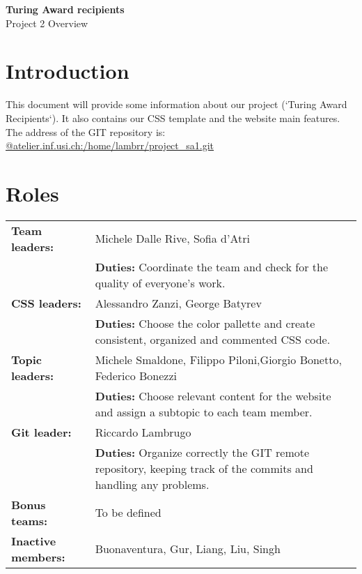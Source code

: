 \documentclass[a4paper,12pt]{article}
\begin{document}
\newcommand{\ttilde}[0]{\raisebox{0.5ex}{\texttildelow}}

\begin{center}
 \huge{\textbf{Turing Award recipients}}\\[.5em]
 \Large{Project 2 Overview}
\end{center}
\vspace{3em}
\tableofcontents

\newpage
\section{Introduction}
This document will provide some information about our project (`Turing Award Recipients`). It also contains our CSS template and the website main features.
The address of the GIT repository is: \url{@atelier.inf.usi.ch:/home/lambrr/project_sa1.git}

\vspace{2em}

\section{Roles}
\begin{tabular}{p{.275\linewidth} p{.65\linewidth}}
\textbf{Team leaders:} & Michele Dalle Rive, Sofia d'Atri\\[.3em]
                        &\textbf{Duties:} Coordinate the team and check for the quality of everyone's work.\\[.5em]
\textbf{CSS leaders:} & Alessandro Zanzi, George Batyrev\\[.3em]
                        &\textbf{Duties:} Choose the color pallette and create consistent, organized and commented CSS code.\\[.5em]
\textbf{Topic leaders:} & Michele Smaldone, Filippo Piloni,\newline Giorgio Bonetto, Federico Bonezzi\\[.3em]
                        &\textbf{Duties:} Choose relevant content for the website and assign a subtopic to each team member.\\[.5em]
\textbf{Git leader:} & Riccardo Lambrugo\\[.3em]
                        &\textbf{Duties:} Organize correctly the GIT remote repository, keeping track of the commits and handling any problems.\\[.5em]
\textbf{Bonus teams:} & To be defined\\[.3em]
\textbf{Inactive members:} & Buonaventura, Gur, Liang, Liu, Singh
\end{tabular}
\end{document}
